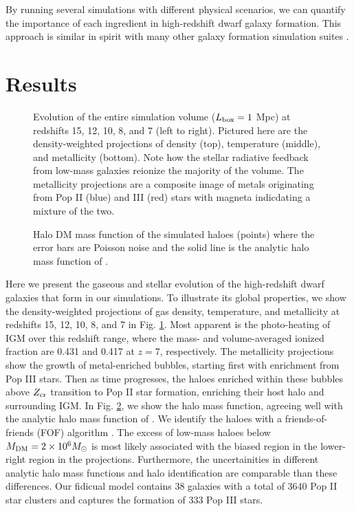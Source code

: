 \documentclass[useAMS,usenatbib]{mn2e}
\begin{document}
By running several simulations with different physical scenarios, we
can quantify the importance of each ingredient in high-redshift dwarf
galaxy formation.  This approach is similar in spirit with many other
galaxy formation simulation suites \citep[e.g.][]{Schaye10,
  Maio10_Pop32}.

\section{Results}
\label{sec:results}

\begin{figure*}
  \caption{\label{fig:evo-mosaic} Evolution of the entire simulation
    volume ($L_{\rm box} = 1$ Mpc) at redshifts 15, 12, 10, 8, and 7
    (left to right).  Pictured here are the density-weighted
    projections of density (top), temperature (middle), and
    metallicity (bottom).  Note how the stellar radiative feedback
    from low-mass galaxies reionize the majority of the volume.  The
    metallicity projections are a composite image of metals
    originating from Pop II (blue) and III (red) stars with magneta
    indicdating a mixture of the two.}
\end{figure*}

\begin{figure}
  \caption{\label{fig:mass_fn} Halo DM mass function of the simulated
    haloes (points) where the error bars are Poisson noise and the
    solid line is the analytic halo mass function of
    \citet{Warren06}.}
\end{figure}



Here we present the gaseous and stellar evolution of the high-redshift
dwarf galaxies that form in our simulations.  To illustrate its global
properties, we show the density-weighted projections of gas density,
temperature, and metallicity at redshifts 15, 12, 10, 8, and 7 in
Fig. \ref{fig:evo-mosaic}.  Most apparent is the photo-heating of IGM
over this redshift range, where the mass- and volume-averaged ionized
fraction are 0.431 and 0.417 at $z=7$, respectively.  The metallicity
projections show the growth of metal-enriched bubbles, starting first
with enrichment from Pop III stars.  Then as time progresses, the
haloes enriched within these bubbles above $Z_{\rm cr}$ transition to
Pop II star formation, enriching their host halo and surrounding IGM.
In Fig. \ref{fig:mass_fn}, we show the halo mass function, agreeing
well with the analytic halo mass function of \citet{Warren06}.  We
identify the haloes with a friends-of-friends (FOF) algorithm
\citep{Davis85}.  The excess of low-mass haloes below $M_{\rm DM} = 2
\times 10^6 \Ms$ is most likely associated with the biased region in
the lower-right region in the projections.  Furthermore, the
uncertainities in different analytic halo mass functions
\citep[see][for a comparison]{Reed07} and halo identification are
comparable than these differences.  Our fidicual model contains 38
galaxies with a total of 3640 Pop II star clusters and captures the
formation of 333 Pop III stars.
\end{document}
